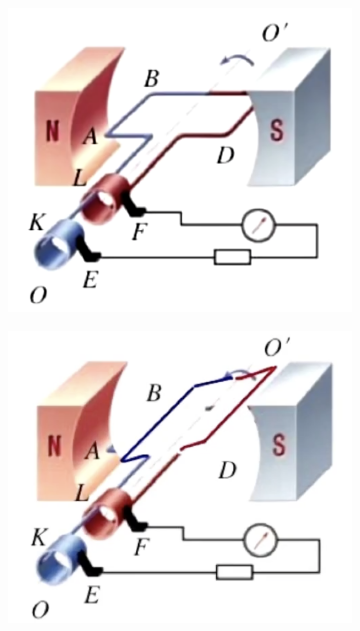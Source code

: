 \documentclass{article}
\begin{document}
\begin{enumerate}
\begin{enumerate}[label=(\arabic*)]
\begin{figure}[h]
                \begin{subfigure}{0.4\textwidth}
                    \centering
                    \includegraphics[width=\textwidth,keepaspectratio]{pictures/1.1-1.png}
                    \caption{} %
                \end{subfigure}
                \hfill %
                \begin{subfigure}{0.4\textwidth}
                    \centering
                    \includegraphics[width=\textwidth,keepaspectratio]{pictures/1.1-2.png}
                    \caption{} %
                \end{subfigure}
            \end{figure}


\end{enumerate}
\end{enumerate}
\end{document}
